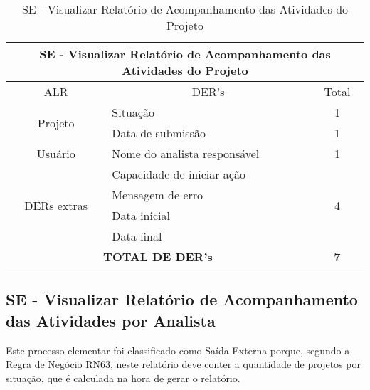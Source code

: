       \begin{table}[!h]
      \centering
      \caption{SE - Visualizar Relatório de Acompanhamento das Atividades do Projeto}
      \label{se_visualizar_relatorio_acompanhamento}
      \begin{tabular}{|c|l|c|}
      \hline
      \multicolumn{3}{|c|}{SE - Visualizar Relatório de Acompanhamento das Atividades do Projeto} \\ \hline
      ALR                              & \multicolumn{1}{c|}{DER's}       & Total                 \\ \hline
      \multirow{2}{*}{Projeto}         & Situação                         & 1                     \\ \cline{2-3} 
				      & Data de submissão                & 1                     \\ \hline
      Usuário                          & Nome do analista responsável     & 1                     \\ \hline
      \multirow{4}{*}{DERs extras}     & Capacidade de iniciar ação       & \multirow{4}{*}{4}    \\ \cline{2-2}
				      & Mensagem de erro                 &                       \\ \cline{2-2}
				      & Data inicial                     &                       \\ \cline{2-2}
				      & Data final                       &                       \\ \hline
      \multicolumn{2}{|c|}{\textbf{TOTAL DE DER's}}                       & \textbf{7}            \\ \hline
      \end{tabular}
      \end{table}
    
  \subsection{SE - Visualizar Relatório de Acompanhamento das Atividades por Analista}
      
      Este processo elementar foi classificado como Saída Externa porque, segundo a Regra de Negócio RN63, neste relatório
    deve conter a quantidade de projetos por situação, que é calculada na hora de gerar o relatório.
      
